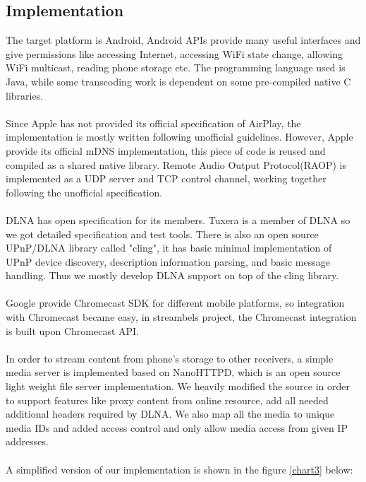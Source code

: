 \subsection{Implementation}
The target platform is Android, Android APIs provide many useful interfaces and
give permissions like accessing Internet, accessing WiFi state change, allowing
WiFi multicast, reading phone storage etc. The programming language used is
Java, while some transcoding work is dependent on some pre-compiled native C
libraries.\\
\\
Since Apple has not provided its official specification of AirPlay, the
implementation is mostly written following unofficial guidelines. However, Apple
provide its official mDNS implementation, this piece of code is reused and
compiled as a shared native library. Remote Audio Output Protocol(RAOP) is
implemented as a UDP server and TCP control channel, working together following
the unofficial specification.\\
\\
DLNA has open specification for its members. Tuxera is a member of DLNA so we
got detailed specification and test tools. There is also an open source UPnP/DLNA
library called "cling"\cite{cling}, it has basic minimal implementation of UPnP
device discovery, description information parsing, and basic message handling.
Thus we mostly develop DLNA support on top of the cling library.\\
\\
Google provide Chromecast SDK for different mobile platforms, so integration
with Chromecast became easy, in streambels project, the Chromecast integration
is built upon Chromecast API.\\
\\
In order to stream content from phone's storage to other receivers, a simple
media server is implemented based on NanoHTTPD, which is an open source light
weight file server implementation. We heavily modified the source in order to
support features like proxy content from online resource, add all needed
additional headers required by DLNA. We also map all the media to unique media
IDs and added access control and only allow media access from given IP
addresses.\\
\\
A simplified version of our implementation is shown in the
figure \ref{chart3} below:
